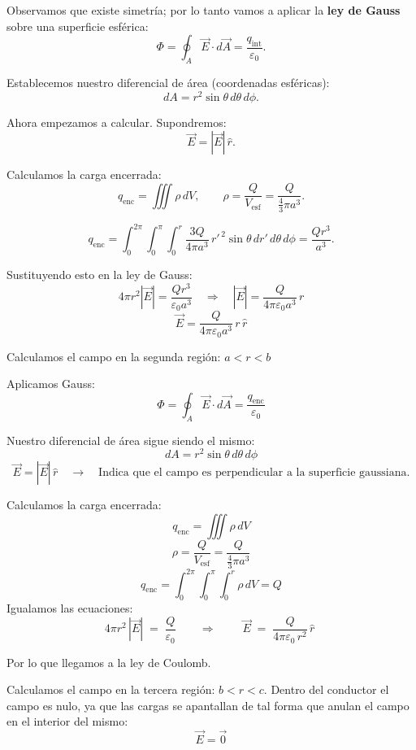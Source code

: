 \documentclass[a4paper,12pt]{article}
\begin{document}
\medskip
\noindent
Observamos que existe simetría; por lo tanto vamos a aplicar la \textbf{ley de Gauss} sobre una superficie esférica:
\[
\Phi=\oint_{A}\vec E\cdot d\vec A=\frac{q_{\text{int}}}{\varepsilon_0}.
\]

\noindent
Establecemos nuestro diferencial de área (coordenadas esféricas):
\[
dA=r^{2}\sin\theta\, d\theta\, d\phi .
\]

\medskip
\noindent
Ahora empezamos a calcular. Supondremos:
\[
\vec E=|\vec E|\,\hat r .
\]

\noindent
Calculamos la carga encerrada:
\[
q_{\text{enc}}=\iiint \rho\, dV,
\qquad
\rho=\frac{Q}{V_{\text{esf}}}=\frac{Q}{\frac{4}{3}\pi a^{3}}.
\]

\[
q_{\text{enc}}
=\int_{0}^{2\pi}\!\!\int_{0}^{\pi}\!\!\int_{0}^{r}
\frac{3Q}{4\pi a^{3}}\,r'^{\,2}\sin\theta \, dr'\, d\theta\, d\phi
=\frac{Q r^{3}}{a^{3}}.
\]

\medskip
\noindent
Sustituyendo esto en la ley de Gauss:
\[
4\pi r^{2} |\vec E| = \frac{Q r^{3}}{\varepsilon_0 a^{3}} 
\quad \Rightarrow \quad 
|\vec E| = \frac{Q}{4\pi \varepsilon_0 a^{3}}\, r
\]
\[
\vec E = \frac{Q}{4\pi \varepsilon_0 a^{3}}\, r\, \hat r
\]

\medskip
\noindent
Calculamos el campo en la segunda región: \( a < r < b \)

\medskip
\noindent
Aplicamos Gauss:
\[
\Phi = \oint_{A} \vec E \cdot d\vec A = \frac{q_{\text{enc}}}{\varepsilon_0}
\]

\noindent
Nuestro diferencial de área sigue siendo el mismo:
\[
dA = r^{2} \sin\theta\, d\theta\, d\phi
\]
\[
\vec E = |\vec E| \, \hat r 
\quad \rightarrow \quad \text{Indica que el campo es perpendicular a la superficie gaussiana.}
\]

\medskip
\noindent
Calculamos la carga encerrada:
\[
q_{\text{enc}} = \iiint \rho\, dV
\]
\[
\rho = \frac{Q}{V_{\text{esf}}} = \frac{Q}{\frac{4}{3}\pi a^{3}}
\]
\[
q_{\text{enc}} = \int_{0}^{2\pi}\!\!\int_{0}^{\pi}\!\!\int_{0}^{r} \rho\, dV = Q
\]
\newpage
\medskip
\noindent
Igualamos las ecuaciones:
\[
4\pi r^{2}\,|\vec E| \;=\; \frac{Q}{\varepsilon_{0}}
\qquad\Longrightarrow\qquad
\boxed{\; \vec E \;=\; \frac{Q}{4\pi \varepsilon_{0}\,r^{2}}\,\hat r \;}
\]

\medskip
\noindent
Por lo que llegamos a la ley de Coulomb.

\medskip
\noindent
Calculamos el campo en la tercera región: \(b<r<c\).
Dentro del conductor el campo es nulo, ya que las cargas se apantallan de tal forma
que anulan el campo en el interior del mismo:
\[
\boxed{\; \vec E = \vec 0 \;}
\]
\end{document}
